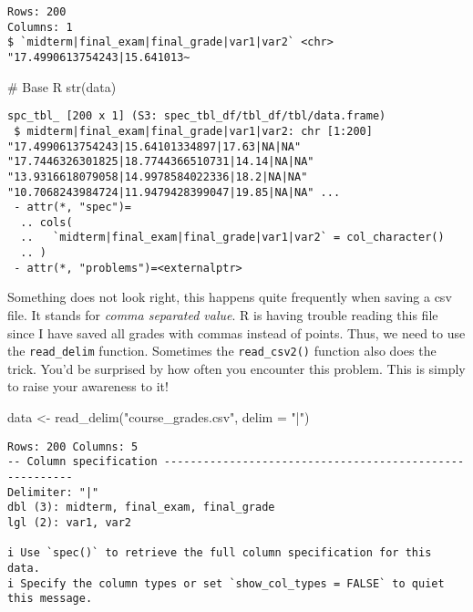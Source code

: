 \documentclass[
  letterpaper,
  DIV=11,
  numbers=noendperiod]{scrreprt}
\newenvironment{Shaded}{\begin{snugshade}}{\end{snugshade}}
\newcommand{\AttributeTok}[1]{\textcolor[rgb]{0.40,0.45,0.13}{#1}}
\newcommand{\CommentTok}[1]{\textcolor[rgb]{0.37,0.37,0.37}{#1}}
\newcommand{\FunctionTok}[1]{\textcolor[rgb]{0.28,0.35,0.67}{#1}}
\newcommand{\NormalTok}[1]{\textcolor[rgb]{0.00,0.23,0.31}{#1}}
\newcommand{\OtherTok}[1]{\textcolor[rgb]{0.00,0.23,0.31}{#1}}
\newcommand{\StringTok}[1]{\textcolor[rgb]{0.13,0.47,0.30}{#1}}
\begin{document}
\begin{verbatim}
Rows: 200
Columns: 1
$ `midterm|final_exam|final_grade|var1|var2` <chr> "17.4990613754243|15.641013~
\end{verbatim}

\begin{Shaded}
\begin{Highlighting}[]
\CommentTok{\# Base R}
\FunctionTok{str}\NormalTok{(data)}
\end{Highlighting}
\end{Shaded}

\begin{verbatim}
spc_tbl_ [200 x 1] (S3: spec_tbl_df/tbl_df/tbl/data.frame)
 $ midterm|final_exam|final_grade|var1|var2: chr [1:200] "17.4990613754243|15.64101334897|17.63|NA|NA" "17.7446326301825|18.7744366510731|14.14|NA|NA" "13.9316618079058|14.9978584022336|18.2|NA|NA" "10.7068243984724|11.9479428399047|19.85|NA|NA" ...
 - attr(*, "spec")=
  .. cols(
  ..   `midterm|final_exam|final_grade|var1|var2` = col_character()
  .. )
 - attr(*, "problems")=<externalptr> 
\end{verbatim}

Something does not look right, this happens quite frequently when saving
a csv file. It stands for \emph{comma separated value}. R is having
trouble reading this file since I have saved all grades with commas
instead of points. Thus, we need to use the \texttt{read\_delim}
function. Sometimes the \texttt{read\_csv2()} function also does the
trick. You'd be surprised by how often you encounter this problem. This
is simply to raise your awareness to it!

\begin{Shaded}
\begin{Highlighting}[]
\NormalTok{data }\OtherTok{\textless{}{-}} \FunctionTok{read\_delim}\NormalTok{(}\StringTok{"course\_grades.csv"}\NormalTok{, }\AttributeTok{delim =} \StringTok{"|"}\NormalTok{)}
\end{Highlighting}
\end{Shaded}

\begin{verbatim}
Rows: 200 Columns: 5
-- Column specification --------------------------------------------------------
Delimiter: "|"
dbl (3): midterm, final_exam, final_grade
lgl (2): var1, var2

i Use `spec()` to retrieve the full column specification for this data.
i Specify the column types or set `show_col_types = FALSE` to quiet this message.
\end{verbatim}
\end{document}
